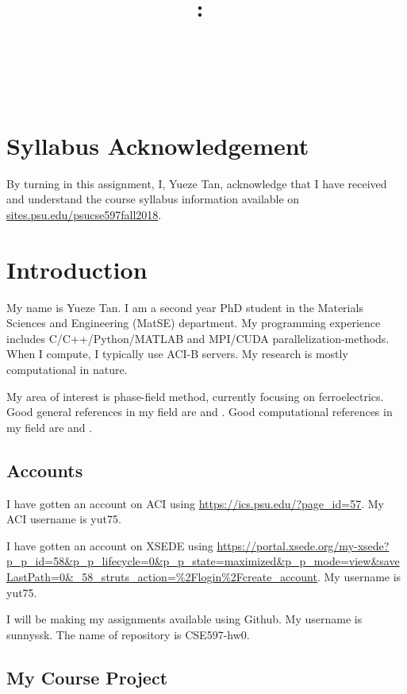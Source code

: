 \documentclass{article}
\title{\vspace{2in}\textmd{\textbf{\hmwkClass:\ \hmwkTitle}}\\\normalsize\vspace{0.1in}\small{\hmwkDueDate}\\\vspace{0.1in}\large{\textit{\hmwkClassInstructor\ \hmwkClassTime}}\vspace{3in}}
\date{}
\author{\textbf{\hmwkAuthorNameb} } %
\begin{document}
\begin{spacing}{1.1}
\maketitle

\newpage
\section{Syllabus Acknowledgement}

By turning in this assignment, I, Yueze Tan, acknowledge that I have received and understand the course syllabus information available on \url{sites.psu.edu/psucse597fall2018}. 

\section{Introduction}

My name is Yueze Tan.  I am a second year PhD student in the Materials Sciences and Engineering (MatSE) department. My programming experience includes C/C++/Python/MATLAB and MPI/CUDA parallelization-methods.  When I compute, I typically use ACI-B servers.  My research is mostly computational in nature. 

My area of interest is phase-field method, currently focusing on ferroelectrics. Good general references in my field are \citet{cssem2005} and \citet{pafrm1977}. Good computational references in my field are \citet{pfmmse2010} and \citet{ppfm2017}.

\subsection{Accounts}

I have gotten an account on ACI using \url{https://ics.psu.edu/?page_id=57}.  My ACI username is yut75.

I have gotten an account on XSEDE using \url{https://portal.xsede.org/my-xsede?p_p_id=58&p_p_lifecycle=0&p_p_state=maximized&p_p_mode=view&saveLastPath=0&_58_struts_action=%2Flogin%2Fcreate_account}.  My username is yut75.

I will be making my assignments available using Github. My username is sunnyssk. The name of repository is CSE597-hw0.

\subsection{My Course Project}


\end{spacing}
\end{document}
